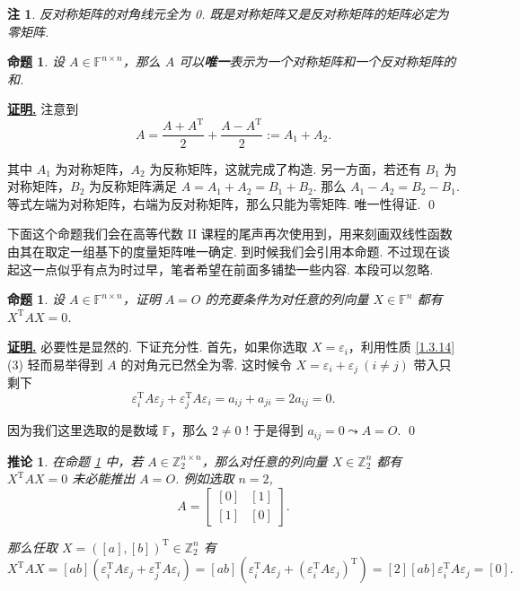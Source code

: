 \documentclass[10pt,openany]{article}
\theoremstyle{thmstyle} %
\theoremstyle{defstyle} %
\newtheorem{corollary}[theorem]{推论}
\theoremstyle{prostyle} %
\newtheorem{proposition}[theorem]{命题}
\theoremstyle{exastyle}
\theoremstyle{remstyle}
\newtheorem{remark}[theorem]{注}
\renewenvironment{proof}[1][证明]{\par\underline{\textbf{#1.}} \;\fangsong}{\qed\par}
\newcommand{\T}{^{\text{T}}}
\newcommand{\F}{\mathbb{F}}
\newcommand{\n}{^{n \times n}}
\begin{document}
\begin{remark}
	反对称矩阵的对角线元全为 0. 既是对称矩阵又是反对称矩阵的矩阵必定为零矩阵.
\end{remark}

\begin{proposition}	\label{1.3.26}
	设 \( A \in \F^{n \times n} \)，那么 \( A \) 可以\textbf{唯一}表示为一个对称矩阵和一个反对称矩阵的和.

\end{proposition}

\begin{proof}
	注意到
	\[ A=\frac{A+A\T}{2}+\frac{A-A\T}{2}:=A_1+A_2. \]
	
	其中 \( A_1 \) 为对称矩阵，\( A_2 \) 为反称矩阵，这就完成了构造. 另一方面，若还有 \( B_1 \) 为对称矩阵，\( B_2 \) 为反称矩阵满足 \( A=A_1+A_2=B_1+B_2 \). 那么 \( A_1-A_2=B_2-B_1 \). 等式左端为对称矩阵，右端为反对称矩阵，那么只能为零矩阵. 唯一性得证.
\end{proof}



下面这个命题我们会在高等代数 II 课程的尾声再次使用到，用来刻画双线性函数由其在取定一组基下的度量矩阵唯一确定. 到时候我们会引用本命题. 不过现在谈起这一点似乎有点为时过早，笔者希望在前面多铺垫一些内容. 本段可以忽略.

\begin{proposition}	\label{1.3.27}
	设 \( A \in \F\n \)，证明 \( A=O \) 的充要条件为对任意的列向量 \( X \in \F^n\) 都有 \( X\T AX=0 \).

\end{proposition} 

\begin{proof}
	必要性是显然的. 下证充分性. 首先，如果你选取 \( X=\varepsilon_i \)，利用性质 \ref{1.3.14} (3) 轻而易举得到 \( A \) 的对角元已然全为零. 这时候令 \( X=\varepsilon_i+\varepsilon_j \ (i \neq j) \) 带入只剩下 
	\[ \varepsilon_i\T A \varepsilon_j+\varepsilon_j\T A \varepsilon_i= a_{ij}+a_{ji}=2a_{ij}=0. \]
	
	因为我们这里选取的是数域 \( \mathbb{F} \)，那么 \( 2 \neq 0 \) ! 于是得到 \( a_{ij}=0 \leadsto A=O \).
\end{proof}

\begin{corollary}
	在命题 \ref{1.3.27} 中，若 \( A \in \mathbb{Z}_2^{n \times n} \)，那么对任意的列向量 \( X \in \mathbb{Z}_2^n\) 都有 \( X\T AX=0 \) 未必能推出 \( A=O \). 例如选取 \( n=2 \),
	\[ A=\begin{bmatrix}
		[0] & [1] \\ [1] & [0]
	\end{bmatrix}. \]
	
	那么任取 \( X=([a],[b])\T \in \mathbb{Z}_2^n \) 有
	\[ X\T AX=[ab](\varepsilon_i\T A \varepsilon_j+\varepsilon_j\T A \varepsilon_i)=[ab](\varepsilon_i\T A \varepsilon_j+(\varepsilon_i\T A \varepsilon_j)\T)=[2][ab]\varepsilon_i\T A \varepsilon_j=[0]. \]
\end{corollary}
\end{document}
